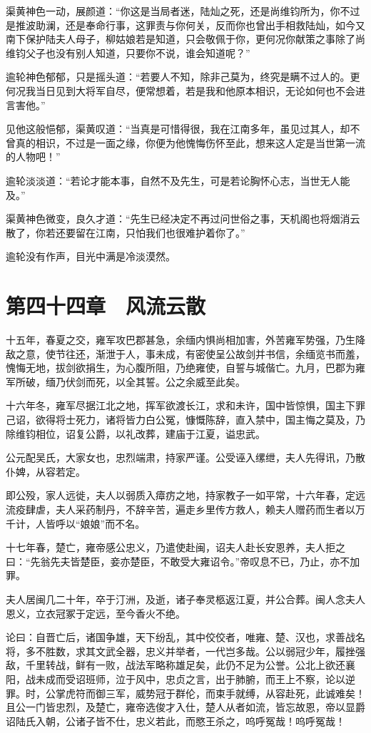 渠黄神色一动，展颜道：“你这是当局者迷，陆灿之死，还是尚维钧所为，你不过是推波助澜，还是奉命行事，这罪责与你何关，反而你也曾出手相救陆灿，如今又南下保护陆夫人母子，柳姑娘若是知道，只会敬佩于你，更何况你献策之事除了尚维钧父子也没有别人知道，只要你不说，谁会知道呢？”

逾轮神色郁郁，只是摇头道：“若要人不知，除非己莫为，终究是瞒不过人的。更何况我当日见到大将军自尽，便常想着，若是我和他原本相识，无论如何也不会进言害他。”

见他这般悒郁，渠黄叹道：“当真是可惜得很，我在江南多年，虽见过其人，却不曾真的相识，不过是一面之缘，你便为他愧悔伤怀至此，想来这人定是当世第一流的人物吧！”

逾轮淡淡道：“若论才能本事，自然不及先生，可是若论胸怀心志，当世无人能及。”

渠黄神色微变，良久才道：“先生已经决定不再过问世俗之事，天机阁也将烟消云散了，你若还要留在江南，只怕我们也很难护着你了。”

逾轮没有作声，目光中满是冷淡漠然。

\chapter{第四十四章　风流云散}

十五年，春夏之交，雍军攻巴郡甚急，余缅内惧尚相加害，外苦雍军势强，乃生降敌之意，使节往还，渐泄于人，事未成，有密使呈公故剑并书信，余缅览书而羞，愧悔无地，拔剑欲捐生，为心腹所阻，乃绝雍使，自誓与城偕亡。九月，巴郡为雍军所破，缅乃伏剑而死，以全其誓。公之余威至此矣。

十六年冬，雍军尽据江北之地，挥军欲渡长江，求和未许，国中皆惊惧，国主下罪己诏，欲得将士死力，诸将皆力白公冤，慷慨陈辞，直入禁中，国主悔之莫及，乃除维钧相位，诏复公爵，以礼改葬，建庙于江夏，谥忠武。

公元配吴氏，大家女也，忠烈端肃，持家严谨。公受诬入缧绁，夫人先得讯，乃散仆婢，从容若定。

即公殁，家人远徙，夫人以弱质入瘴疠之地，持家教子一如平常，十六年春，定远流疫肆虐，夫人采药制丹，不辞辛苦，遍走乡里传方救人，赖夫人赠药而生者以万千计，人皆呼以“娘娘”而不名。

十七年春，楚亡，雍帝感公忠义，乃遣使赴闽，诏夫人赴长安恩养，夫人拒之曰：“先翁先夫皆楚臣，妾亦楚臣，不敢受大雍诏令。”帝叹息不已，乃止，亦不加罪。

夫人居闽几二十年，卒于汀洲，及逝，诸子奉灵柩返江夏，并公合葬。闽人念夫人恩义，立衣冠冢于定远，至今香火不绝。

论曰：自晋亡后，诸国争雄，天下纷乱，其中佼佼者，唯雍、楚、汉也，求善战名将，多不胜数，求其文武全器，忠义并举者，一代岂多哉。公以弱冠少年，履挫强敌，千里转战，鲜有一败，战法军略称雄足矣，此仍不足为公誉。公北上欲还襄阳，战未成而受诏班师，泣于风中，忠贞之言，出于肺腑，而王上不察，论以逆罪。时，公掌虎符而御三军，威势冠于群伦，而束手就缚，从容赴死，此诚难矣！且公一门皆忠烈，及楚亡，雍帝选俊才入仕，楚人从者如流，皆忘故恩，帝以显爵诏陆氏入朝，公诸子皆不仕，忠义若此，而愍王杀之，呜呼冤哉！呜呼冤哉！

